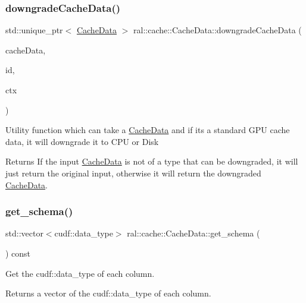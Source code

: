 \subsubsection{\texorpdfstring{downgrade\+Cache\+Data()}{downgradeCacheData()}}
{\footnotesize\ttfamily std\+::unique\+\_\+ptr$<$ \hyperlink{classral_1_1cache_1_1CacheData}{Cache\+Data} $>$ ral\+::cache\+::\+Cache\+Data\+::downgrade\+Cache\+Data (\begin{DoxyParamCaption}\item[{std\+::unique\+\_\+ptr$<$ \hyperlink{classral_1_1cache_1_1CacheData}{Cache\+Data} $>$}]{cache\+Data,  }\item[{std\+::string}]{id,  }\item[{std\+::shared\+\_\+ptr$<$ \hyperlink{classblazingdb_1_1manager_1_1Context}{Context} $>$}]{ctx }\end{DoxyParamCaption})\hspace{0.3cm}{\ttfamily [static]}}

Utility function which can take a \hyperlink{classral_1_1cache_1_1CacheData}{Cache\+Data} and if its a standard G\+PU cache data, it will downgrade it to C\+PU or Disk \begin{DoxyReturn}{Returns}
If the input \hyperlink{classral_1_1cache_1_1CacheData}{Cache\+Data} is not of a type that can be downgraded, it will just return the original input, otherwise it will return the downgraded \hyperlink{classral_1_1cache_1_1CacheData}{Cache\+Data}. 
\end{DoxyReturn}
\mbox{\label{classral_1_1cache_1_1CacheData_a747bc7b9113756471ce8a7bce2c46689}} 
\subsubsection{\texorpdfstring{get\+\_\+schema()}{get\_schema()}}
{\footnotesize\ttfamily std\+::vector$<$cudf\+::data\+\_\+type$>$ ral\+::cache\+::\+Cache\+Data\+::get\+\_\+schema (\begin{DoxyParamCaption}{ }\end{DoxyParamCaption}) const\hspace{0.3cm}{\ttfamily [inline]}}

Get the cudf\+::data\+\_\+type of each column. \begin{DoxyReturn}{Returns}
a vector of the cudf\+::data\+\_\+type of each column. 
\end{DoxyReturn}
\mbox{\label{classral_1_1cache_1_1CacheData_a6669c7c34305f2099cede2be98433604}} 
